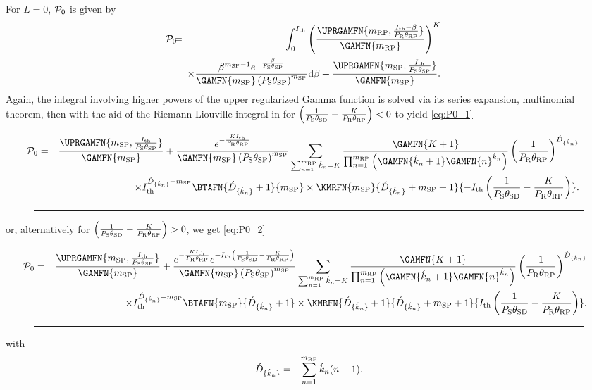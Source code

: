 \documentclass[10pt,journal]{IEEEtran}
\begin{document}
For $L=0$, $\mathcal{P}_0$ is given by
\begin{eqnarray}
\!\!\!\!\!\!\!\!\!\!\!\!\!\!\!\!\!\!\Pzero
\!\!\!&=&\!\!\!\int_0^{\Ith} \left(\frac{\UPRGAMFN{\mrp,\frac{\Ith-\beta}{\PR\thetarp}}}{\GAMFN{\mrp}}\right)^{K}
\nonumber\\\!\!\!&&\!\!\!\times
\frac{\beta^{\msp-1}e^{-\frac{\beta}{\PS\thetasp}}}{\GAMFN{\msp}\left(\PS\thetasp\right)^\msp}
\mathrm{d}\beta  +\frac{\UPRGAMFN{\msp,\frac{\Ith}{\PS\thetasp}}}{\GAMFN{\msp}}.
\end{eqnarray}
Again, the integral involving higher powers of the upper regularized Gamma function is solved via its series expansion, multinomial theorem, then with the aid of the Riemann-Liouville integral in \cite[Eq. 3.383-1]{gradshteyn_ryzhik} for $\left(\frac{1}{P_{{\rm S}}{\theta_{{\rm S} {\rm D}}}}-\frac{K}{P_{{\rm R}}{\theta_{{\rm R} {\rm P}}}}\right)<0$ to yield \eqref{eq:P0_1}
\begin{figure*}
\centering
\begin{eqnarray}
\!\!\!\!\!\!\!\!\!\!\!\!\Pzero
&=& \frac{\UPRGAMFN{\msp,\frac{\Ith}{\PS\thetasp}}}{\GAMFN{\msp}} +
\frac{e^{-\frac{K\Ith}{\PR\thetarp}}}{\GAMFN{\msp}\left(\PS\thetasp\right)^\msp}
 \sum_{\sum_{n=1}^{\mrp} \acute{k}_{n} = K} \frac{\GAMFN{K+1}}{\prod_{n=1}^{\mrp}\left(\GAMFN{\acute{k}_n+1}\GAMFN{n}^{\acute{k}_n}\right)} \left(\frac{1}{\PR\thetarp}\right)^{\acute{D}_{\{\acute{k}_n\}}} \nonumber\\
&&
\times  \Ith^{\acute{D}_{\{\acute{k}_n\}}+\msp} \BTAFN{\acute{D}_{\{\acute{k}_n\}}+1}{\msp}
\times \KMRFN{\msp}{\acute{D}_{\{\acute{k}_n\}}+\msp+1}{-\Ith \left(\frac{1}{\PS\thetasd}-\frac{K}{\PR\thetarp}\right)}. \label{eq:P0_1}
\end{eqnarray}
\hrule
\end{figure*}
or, alternatively for $\left(\frac{1}{P_{{\rm S}}{\theta_{{\rm S} {\rm D}}}}-\frac{K}{P_{{\rm R}}{\theta_{{\rm R} {\rm P}}}}\right)>0$, we get \eqref{eq:P0_2}
\begin{figure*}
\centering
\begin{eqnarray}
\!\!\!\!\!\!\!\!\!\!\!\!\Pzero
&=& \frac{\UPRGAMFN{\msp,\frac{\Ith}{\PS\thetasp}}}{\GAMFN{\msp}} +
\frac{e^{-\frac{K\Ith}{\PR\thetarp}} e^{-\Ith \left(\frac{1}{\PS\thetasd}-\frac{K}{\PR\thetarp}\right)}}{\GAMFN{\msp}\left(\PS\thetasp\right)^\msp}
 \sum_{\sum_{n=1}^{\mrp} \acute{k}_{n} = K} \frac{\GAMFN{K+1}}{\prod_{n=1}^{\mrp}\left(\GAMFN{\acute{k}_n+1}\GAMFN{n}^{\acute{k}_n}\right)} \left(\frac{1}{\PR\thetarp}\right)^{\acute{D}_{\{\acute{k}_n\}}} \nonumber\\
&&
\times  \Ith^{\acute{D}_{\{\acute{k}_n\}}+\msp} \BTAFN{\msp}{\acute{D}_{\{\acute{k}_n\}}+1}
\times \KMRFN{\acute{D}_{\{\acute{k}_n\}}+1}{\acute{D}_{\{\acute{k}_n\}}+\msp+1}{\Ith \left(\frac{1}{\PS\thetasd}-\frac{K}{\PR\thetarp}\right)}. \label{eq:P0_2}
\end{eqnarray}
\hrule
\end{figure*}
with
\begin{eqnarray}
\acute{D}_{\{\acute{k}_n\}}&=&\sum_{n=1}^{{m_{{\rm R} {\rm P}}}}\acute{k}_n(n-1).
\end{eqnarray}
\end{document}
